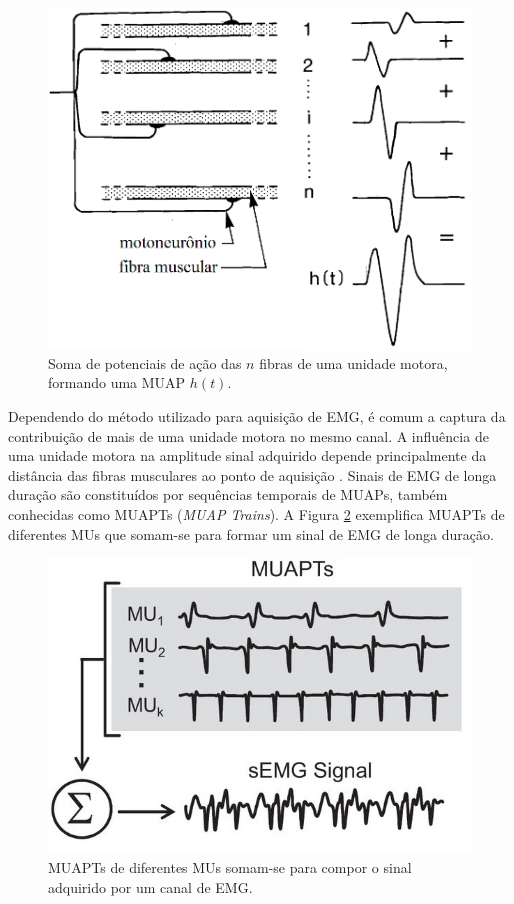 \begin{figure}[htb]
	\caption{\label{fig_MUAP_comp}Soma de potenciais de ação das $n$ fibras de uma unidade motora, formando uma MUAP $h(t)$.}
	\begin{center}
	    \includegraphics[width=0.75\linewidth]{./img/MUAP_oneMU.png}
	\end{center}
\end{figure}

Dependendo do método utilizado para aquisição de EMG, é comum a captura da contribuição de mais de uma unidade motora no mesmo canal. A influência de uma unidade motora na amplitude sinal adquirido depende principalmente da distância das fibras musculares ao ponto de aquisição \cite{Gerdle1999}. Sinais de EMG de longa duração são constituídos por sequências temporais de MUAPs, também conhecidas como MUAPTs (\emph{MUAP Trains}). A Figura \ref{fig_MUAP_trains} exemplifica MUAPTs de diferentes MUs que somam-se para formar um sinal de EMG de longa duração.

\begin{figure}[htb]
	\caption{\label{fig_MUAP_trains}MUAPTs de diferentes MUs somam-se para compor o sinal adquirido por um canal de EMG.}
	\begin{center}
	    \includegraphics[width=0.75\linewidth]{./img/MUAP_trains.jpg}
	\end{center}
\end{figure}

